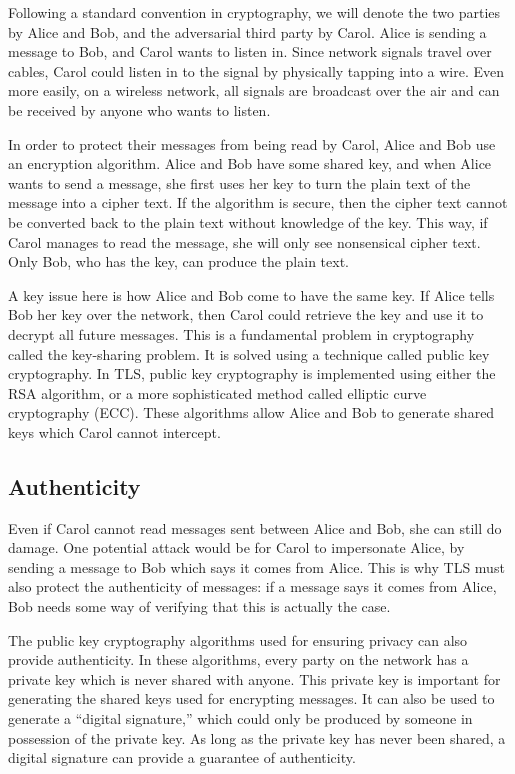 Following a standard convention in cryptography, we will denote the two parties by Alice and Bob, and the adversarial third party by Carol. Alice is sending a message to Bob, and Carol wants to listen in. Since network signals travel over cables, Carol could listen in to the signal by physically tapping into a wire. Even more easily, on a wireless network, all signals are broadcast over the air and can be received by anyone who wants to listen.

In order to protect their messages from being read by Carol, Alice and Bob use an encryption algorithm. Alice and Bob have some shared key, and when Alice wants to send a message, she first uses her key to turn the plain text of the message into a cipher text. If the algorithm is secure, then the cipher text cannot be converted back to the plain text without knowledge of the key. This way, if Carol manages to read the message, she will only see nonsensical cipher text. Only Bob, who has the key, can produce the plain text.

A key issue here is how Alice and Bob come to have the same key. If Alice tells Bob her key over the network, then Carol could retrieve the key and use it to decrypt all future messages. This is a fundamental problem in cryptography called the key-sharing problem. It is solved using a technique called public key cryptography. In TLS, public key cryptography is implemented using either the RSA algorithm, or a more sophisticated method called elliptic curve cryptography (ECC). These algorithms allow Alice and Bob to generate shared keys which Carol cannot intercept.

\subsection{Authenticity}

Even if Carol cannot read messages sent between Alice and Bob, she can still do damage. One potential attack would be for Carol to impersonate Alice, by sending a message to Bob which says it comes from Alice. This is why TLS must also protect the authenticity of messages: if a message says it comes from Alice, Bob needs some way of verifying that this is actually the case.

The public key cryptography algorithms used for ensuring privacy can also provide authenticity. In these algorithms, every party on the network has a private key which is never shared with anyone. This private key is important for generating the shared keys used for encrypting messages. It can also be used to generate a ``digital signature,'' which could only be produced by someone in possession of the private key. As long as the private key has never been shared, a digital signature can provide a guarantee of authenticity.

